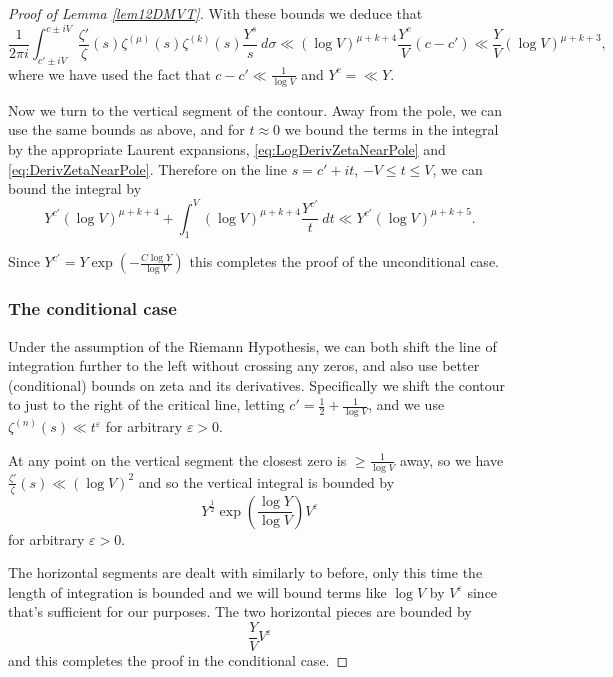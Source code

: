 \documentclass[12pt, a4paper,reqno]{amsart}
\theoremstyle{definition}
\numberwithin{equation}{section}
\begin{document}
\begin{proof}[Proof of Lemma \ref{lem12DMVT}]
With these bounds we deduce that
\begin{equation*}
    \frac{1}{2\pi i}\int_{c'\pm iV}^{c\pm iV}\frac{\zeta'}{\zeta}(s)\zeta^{(\mu)}(s)\zeta^{(k)}(s)\frac{Y^s}{s}\ d\sigma\ll (\log V)^{\mu+k+4}\frac{Y^c}{V}(c-c')\ll \frac{Y}{V}(\log V)^{\mu+k+3},
\end{equation*}
where we have used the fact that $c-c'\ll \frac{1}{\log V}$ and $Y^c = \ll Y$.

Now we turn to the vertical segment of the contour. Away from the pole, we can use the same bounds as above, and for $t\approx 0$ we bound the terms in the integral by the appropriate Laurent expansions, \eqref{eq:LogDerivZetaNearPole} and \eqref{eq:DerivZetaNearPole}. Therefore on the line $s=c'+it$, $-V\le t\le V$, we can bound the integral by 
\begin{equation*}
Y^{c'} (\log V)^{\mu+k+4} + \int_{1}^V (\log V)^{\mu+k+4} \frac{Y^{c'}}{t}\ dt \ll Y^{c'}(\log V)^{\mu+k+5}.
\end{equation*}

Since $Y^{c'}=Y\exp\left(-\frac{C\log Y}{\log V}\right)$ this completes the proof of the unconditional case. 

    
\subsubsection*{The conditional case}\hfill

 Under the assumption of the Riemann Hypothesis, we can both shift the line of integration further to the left without crossing any zeros, and also use better (conditional) bounds on zeta and its derivatives. Specifically we shift the contour to just to the right of the critical line, letting $c'=\frac{1}{2}+\frac{1}{\log V}$, and we use $\zeta^{(n)}(s)\ll t^{\varepsilon}$ for arbitrary $\varepsilon>0$.

At any point on the vertical segment the closest zero is $\ge \frac{1}{\log V}$ away, so we have $\frac{\zeta'}{\zeta}(s)\ll (\log V)^2$ and so  the vertical integral is bounded by
\begin{equation*}
Y^{\frac{1}{2}} \exp\left(\frac{\log Y}{\log V}\right) V^\varepsilon
\end{equation*}
for arbitrary $\varepsilon>0$.

The horizontal segments are dealt with similarly to before, only this time the length of integration is bounded and we will bound terms like $\log V$ by $V^\varepsilon$ since that's sufficient for our purposes. The two horizontal pieces are bounded by
\begin{equation*}
    \frac{Y}{V} V^{\varepsilon}
\end{equation*}
and this completes the proof in the conditional case.
\end{proof}
\end{document}
